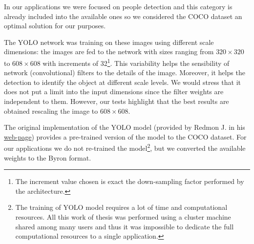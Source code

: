 \documentclass{standalone}
\begin{document}
In our applications we were focused on people detection and this category is already included into the available ones so we considered the COCO dataset an optimal solution for our purposes.

The YOLO network was training on these images using different scale dimensions: the images are fed to the network with sizes ranging from $320\times320$ to $608\times608$ with increments of 32\footnote{
  The increment value chosen is exact the down-sampling factor performed by the architecture.
}.
This variability helps the sensibility of network (convolutional) filters to the details of the image.
Moreover, it helps the detection to identify the object at different scale levels.
We would stress that it does not put a limit into the input dimensions since the filter weights are independent to them.
However, our tests highlight that the best results are obtained rescaling the image to $608\times608$.

The original implementation of the YOLO model (provided by Redmon J. in his \href{https://pjreddie.com/darknet/yolo}{web-page}) provides a pre-trained version of the model to the COCO dataset.
For our applications we do not re-trained the model\footnote{
  The training of YOLO model requires a lot of time and computational resources.
  All this work of thesis was performed using a cluster machine shared among many users and thus it was impossible to dedicate the full computational resources to a single application.
}, but we converted the available weights to the \textsf{Byron} format.
\end{document}
